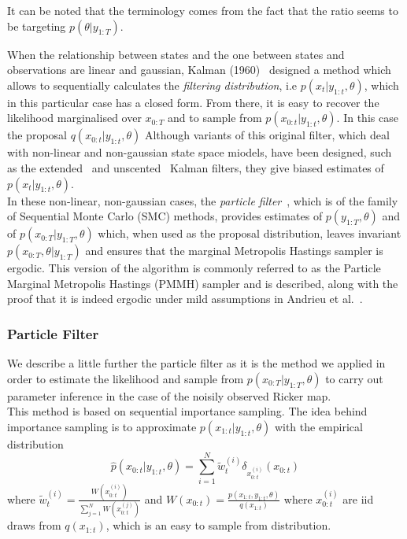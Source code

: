\documentclass[12pt]{article}
\begin{document}
	It can be noted that the terminology comes from the fact that the ratio seems to be targeting $p(\theta | y_{1:T})$.
	
 	When the relationship between states and the one between states and observations are linear and gaussian, Kalman (1960)~\cite{Kalman1960} designed a method which allows to sequentially calculates the \emph{filtering distribution}, i.e $p(x_{t}| y_{1:t}, \theta)$, which in this particular case has a closed form. From there, it is easy to recover the likelihood marginalised over $x_{0:T}$ and to sample from $p(x_{0:t}| y_{1:t}, \theta)$. In this case the proposal $q(x_{0:t}| y_{1:t}, \theta)$ Although variants of this original filter, which deal with non-linear and non-gaussian state space miodels, have been designed, such as the extended~\cite{McElhoe1966} and unscented~\cite{Julier1997} Kalman filters, they give biased estimates of $p(x_t|y_{1:t}, \theta)$. \\
 	
 	In these non-linear, non-gaussian cases, the \emph{particle filter}~\cite{Gordon1993}, which is of the family of Sequential Monte Carlo (SMC) methods, provides estimates of $p(y_{1:T}, \theta)$ and of $p(x_{0:T}|y_{1:T}, \theta)$ which, when used as the proposal distribution, leaves invariant $p(x_{0:T}, \theta|y_{1:T})$ and ensures that the marginal Metropolis Hastings sampler is ergodic. This version of the algorithm is commonly referred to as the Particle Marginal Metropolis Hastings (PMMH) sampler and is described, along with the proof that it is indeed ergodic under mild assumptions in Andrieu et al.~\cite{andrieu2010particle}.
	
	\subsubsection{Particle Filter}
	We describe a little further the particle filter as it is the method we applied in order to estimate the likelihood and sample from $p(x_{0:T}|y_{1:T}, \theta)$ to carry out parameter inference in the case of the noisily observed Ricker map. \\
	This method is based on sequential importance sampling.
	The idea behind importance sampling is to approximate $p(x_{1:t}|y_{1:t}, \theta)$ with the empirical distribution
	\begin{equation}
	\hat{p}(x_{0:t}|y_{1:t}, \theta) = \sum_{i=1}^{N}\tilde{w}_t^{(i)} \delta_{x_{0:t}^{(i)}}(x_{0:t})
	\end{equation}
	where $\tilde{w}_t^{(i)} = \frac{W(x_{0:t}^{(i)})}{\sum_{j=1}^{N} W(x_{0:t}^{(j)})}$ and $W(x_{0:t}) = \frac{p(x_{1:t},y_{1:t}, \theta)}{q(x_{1:t})}$ where $x_{0:t}^{(i)}$ are iid draws from $q(x_{1:t})$, which is an easy to sample from distribution.
	
\end{document}
